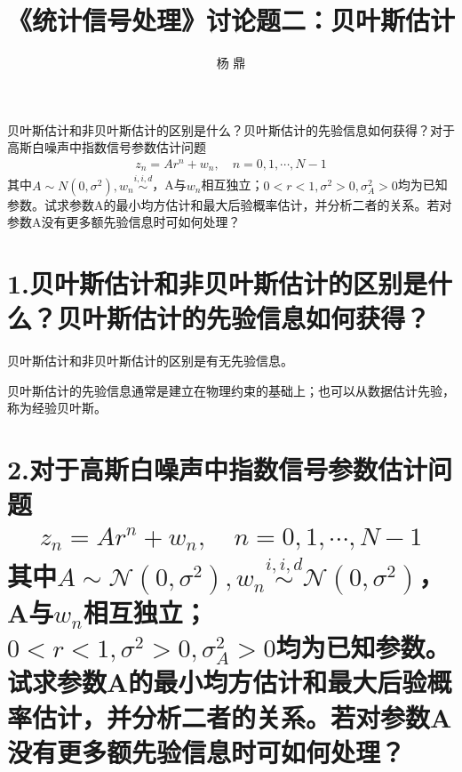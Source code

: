 \documentclass[fontset=windows]{article}
\title{\heiti\zihao{2} 《统计信号处理》讨论题二：贝叶斯估计}
\author{杨 鼎}
\date{}
\numberwithin{figure}{section}
\begin{document}
\maketitle
\thispagestyle{empty}



贝叶斯估计和非贝叶斯估计的区别是什么？贝叶斯估计的先验信息如何获得？对于高斯白噪声中指数信号参数估计问题
\begin{align*}
    z_n=Ar^n+w_n,\quad n=0,1,\cdots,N-1
\end{align*}
其中\(A\sim N(0,\sigma^2),w_n\overset{i,i,d}{\sim}\)，A与\(w_n\)相互独立；\(0<r<1,\sigma^2>0,\sigma^2_A>0\)均为已知参数。试求参数A的最小均方估计和最大后验概率估计，并分析二者的关系。若对参数A没有更多额先验信息时可如何处理？

\section*{1.贝叶斯估计和非贝叶斯估计的区别是什么？贝叶斯估计的先验信息如何获得？}

贝叶斯估计和非贝叶斯估计的区别是有无先验信息。

贝叶斯估计的先验信息通常是建立在物理约束的基础上；也可以从数据估计先验，称为经验贝叶斯。

\section*{2.对于高斯白噪声中指数信号参数估计问题
  \begin{align*}
      z_n=Ar^n+w_n,\quad n=0,1,\cdots,N-1
  \end{align*}
  其中\(A\sim \mathcal{N}(0,\sigma^2),w_n\overset{i,i,d}{\sim}\mathcal{N}(0,\sigma^2)\)，A与\(w_n\)相互独立；\(0<r<1,\sigma^2>0,\sigma^2_A>0\)均为已知参数。试求参数A的最小均方估计和最大后验概率估计，并分析二者的关系。若对参数A没有更多额先验信息时可如何处理？}
\end{document}
